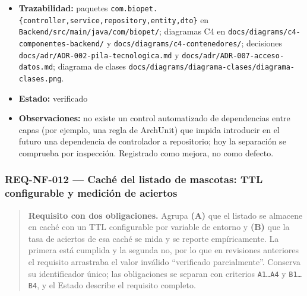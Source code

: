 \documentclass[
  spanish,
]{article}
\begin{document}
\begin{itemize}
  render \texttt{c4-\allowbreak{}componentes-\allowbreak{}backend.\allowbreak{}png} (criterio 4).
\item
  \textbf{Trazabilidad:} paquetes
  \texttt{com.\allowbreak{}biopet.\allowbreak{}\{controller,\allowbreak{}service,\allowbreak{}repository,\allowbreak{}entity,\allowbreak{}dto\}} en
  \texttt{Backend/\allowbreak{}src/\allowbreak{}main/\allowbreak{}java/\allowbreak{}com/\allowbreak{}biopet/}; diagramas C4 en
  \texttt{docs/\allowbreak{}diagrams/\allowbreak{}c4-\allowbreak{}componentes-\allowbreak{}backend/} y
  \texttt{docs/\allowbreak{}diagrams/\allowbreak{}c4-\allowbreak{}contenedores/}; decisiones
  \texttt{docs/\allowbreak{}adr/\allowbreak{}ADR-\allowbreak{}002-\allowbreak{}pila-\allowbreak{}tecnologica.\allowbreak{}md} y
  \texttt{docs/\allowbreak{}adr/\allowbreak{}ADR-\allowbreak{}007-\allowbreak{}acceso-\allowbreak{}datos.\allowbreak{}md}; diagrama de clases
  \texttt{docs/\allowbreak{}diagrams/\allowbreak{}diagrama-\allowbreak{}clases/\allowbreak{}diagrama-\allowbreak{}clases.\allowbreak{}png}.
\item
  \textbf{Estado:} verificado
\item
  \textbf{Observaciones:} no existe un control automatizado de
  dependencias entre capas (por ejemplo, una regla de ArchUnit) que
  impida introducir en el futuro una dependencia de controlador a
  repositorio; hoy la separación se comprueba por inspección. Registrado
  como mejora, no como defecto.
\end{itemize}

\subsubsection{REQ-NF-012 --- Caché del listado de mascotas: TTL
configurable y medición de
aciertos}\label{req-nf-012-cachuxe9-del-listado-de-mascotas-ttl-configurable-y-mediciuxf3n-de-aciertos}

\begin{quote}
\textbf{Requisito con dos obligaciones.} Agrupa \textbf{(A)} que el
listado se almacene en caché con un TTL configurable por variable de
entorno y \textbf{(B)} que la tasa de aciertos de esa caché se mida y se
reporte empíricamente. La primera está cumplida y la segunda no, por lo
que en revisiones anteriores el requisito arrastraba el valor inválido
``verificado parcialmente''. Conserva su identificador único; las
obligaciones se separan con criterios \texttt{A1…A4} y \texttt{B1…B4}, y
el Estado describe el requisito completo.
\end{quote}
\end{document}
